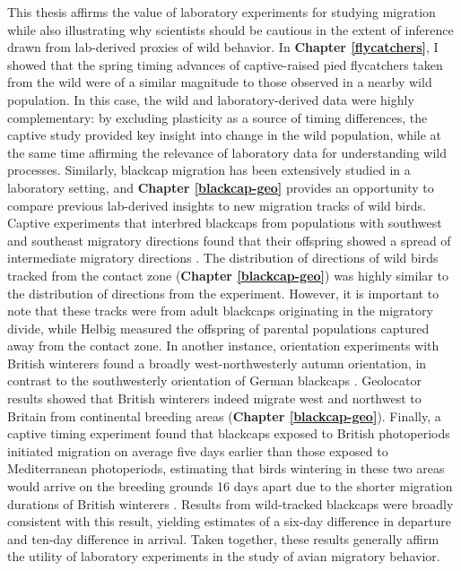 \documentclass[a4paper, nobind]{templates/ociamthesis}
\begin{document}
This thesis affirms the value of laboratory experiments for studying migration while also illustrating why scientists should be cautious in the extent of inference drawn from lab-derived proxies of wild behavior. In \textbf{Chapter \ref{flycatchers}}, I showed that the spring timing advances of captive-raised pied flycatchers taken from the wild were of a similar magnitude to those observed in a nearby wild population. In this case, the wild and laboratory-derived data were highly complementary: by excluding plasticity as a source of timing differences, the captive study provided key insight into change in the wild population, while at the same time affirming the relevance of laboratory data for understanding wild processes. Similarly, blackcap migration has been extensively studied in a laboratory setting, and \textbf{Chapter \ref{blackcap-geo}} provides an opportunity to compare previous lab-derived insights to new migration tracks of wild birds. Captive experiments that interbred blackcaps from populations with southwest and southeast migratory directions found that their offspring showed a spread of intermediate migratory directions \autocite{helbigInheritanceMigratoryDirection1991}. The distribution of directions of wild birds tracked from the contact zone (\textbf{Chapter \ref{blackcap-geo}}) was highly similar to the distribution of directions from the experiment. However, it is important to note that these tracks were from adult blackcaps originating in the migratory divide, while Helbig measured the offspring of parental populations captured away from the contact zone. In another instance, orientation experiments with British winterers found a broadly west-northwesterly autumn orientation, in contrast to the southwesterly orientation of German blackcaps \autocite{bertholdRapidMicroevolutionMigratory1992,helbigInheritanceNovelMigratory1994}. Geolocator results showed that British winterers indeed migrate west and northwest to Britain from continental breeding areas (\textbf{Chapter \ref{blackcap-geo}}). Finally, a captive timing experiment found that blackcaps exposed to British photoperiods initiated migration on average five days earlier than those exposed to Mediterranean photoperiods, estimating that birds wintering in these two areas would arrive on the breeding grounds 16 days apart due to the shorter migration durations of British winterers \autocite{terrillEcophysiologicalAspectsRapid1990}. Results from wild-tracked blackcaps were broadly consistent with this result, yielding estimates of a six-day difference in departure and ten-day difference in arrival. Taken together, these results generally affirm the utility of laboratory experiments in the study of avian migratory behavior.
\end{document}
